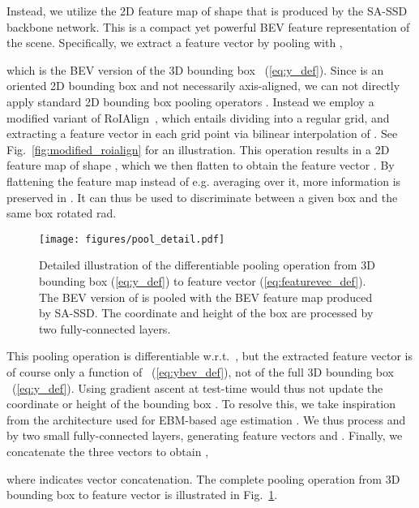 \documentclass[letterpaper, 10 pt, conference]{ieeeconf}
\begin{document}
Instead, we utilize the 2D feature map  of shape  that is produced by the SA-SSD backbone network. This is a compact yet powerful BEV feature representation of the scene. Specifically, we extract a feature vector  by pooling  with ,

which is the BEV version of the 3D bounding box ~(\ref{eq:y_def}). Since  is an oriented 2D bounding box and not necessarily axis-aligned, we can not directly apply standard 2D bounding box pooling operators \cite{Girshick2015FastR, He2017MaskR, jiang2018acquisition}. Instead we employ a modified variant of RoIAlign~\cite{He2017MaskR}, which entails dividing  into a regular  grid, and extracting a feature vector  in each grid point via bilinear interpolation of . See Fig.~\ref{fig:modified_roialign} for an illustration. This operation results in a 2D feature map of shape , which we then flatten to obtain the feature vector . By flattening the feature map instead of e.g. averaging over it, more information is preserved in . It can thus be used to discriminate between a given box and the same box rotated  rad.

\begin{figure}[t]
    \centering
    \texttt{[image: figures/pool\_detail.pdf]}\vspace{-6.0mm}
    \caption{Detailed illustration of the differentiable pooling operation from 3D bounding box  (\ref{eq:y_def}) to feature vector  (\ref{eq:featurevec_def}). The BEV version of  is pooled with the BEV feature map produced by SA-SSD. The  coordinate  and height  of the box  are processed by two fully-connected layers. }\vspace{-3mm}
    \label{fig:3dbbox_pooling}
\end{figure}

This pooling operation is differentiable w.r.t.\ , but the extracted feature vector  is of course only a function of ~(\ref{eq:ybev_def}), not of the full 3D bounding box ~(\ref{eq:y_def}). Using gradient ascent at test-time would thus not update the  coordinate  or height  of the bounding box . To resolve this, we take inspiration from the architecture used for EBM-based age estimation \cite{gustafsson2019learning}. We thus process  and  by two small fully-connected layers, generating feature vectors  and . Finally, we concatenate the three vectors to obtain , 

where  indicates vector concatenation. The complete pooling operation from 3D bounding box  to feature vector  is illustrated in Fig.~\ref{fig:3dbbox_pooling}.
\end{document}

